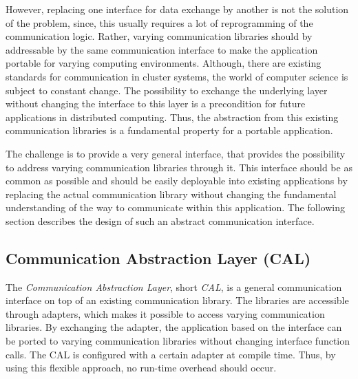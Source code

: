 However, replacing one interface for data exchange by another is not
the solution of the problem, since, this usually requires a lot of
reprogramming of the communication logic.  Rather, varying
communication libraries should by addressable by the same
communication interface to make the application portable for varying
computing environments. Although, there are existing standards for
communication in cluster systems, the world of computer science is
subject to constant change.  The possibility to exchange the
underlying layer without changing the interface to this layer is a
precondition for future applications in distributed computing.  Thus,
the abstraction from this existing communication libraries is a
fundamental property for a portable application.

The challenge is to provide a very general interface, that provides
the possibility to address varying communication libraries through it.
This interface should be as common as possible and should be easily
deployable into existing applications by replacing the actual
communication library without changing the fundamental understanding
of the way to communicate within this application. The following
section describes the design of such an abstract communication
interface.


\subsection{Communication Abstraction Layer (CAL)}
\label{sec:cal}

The \textit{Communication Abstraction Layer}, short \textit{CAL}, is a
general communication interface on top of an existing communication
library. The libraries are accessible through adapters, which makes it
possible to access varying communication libraries. By exchanging the
adapter, the application based on the interface can be ported to
varying communication libraries without changing interface function
calls. The CAL is configured with a certain adapter at compile
time. Thus, by using this flexible approach, no run-time overhead
should occur.

